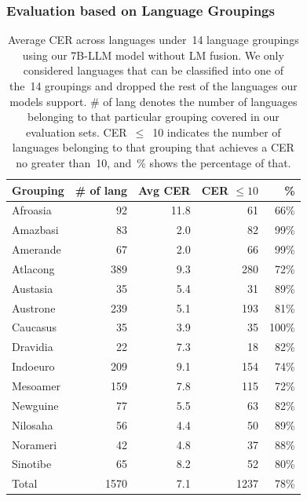 \documentclass[]{fairmeta}
\begin{document}
\subsubsection{Evaluation based on Language Groupings}
\begin{table}[htbp]
  \centering
  \begin{tabular}{lrrrr}
    \toprule
    Grouping & \# of lang & Avg CER & CER $\leq 10$ & \% \\
    \midrule
    Afroasia   &   92  &  11.8  &  61  &  66\%  \\
    Amazbasi   &   83  &   2.0  &  82  &  99\%  \\
    Amerande   &   67  &   2.0  &  66  &  99\%  \\
    Atlacong   &  389  &   9.3  & 280  &  72\%  \\
    Austasia   &   35  &   5.4  &  31  &  89\%  \\
    Austrone   &  239  &   5.1  & 193  &  81\%  \\
    Caucasus   &   35  &   3.9  &  35  & 100\%  \\
    Dravidia   &   22  &   7.3  &  18  &  82\%  \\
    Indoeuro   &  209  &   9.1  & 154  &  74\%  \\
    Mesoamer   &  159  &   7.8  & 115  &  72\%  \\
    Newguine   &   77  &   5.5  &  63  &  82\%  \\
    Nilosaha   &   56  &   4.4  &  50  &  89\%  \\
    Norameri   &   42  &   4.8  &  37  &  88\%  \\
    Sinotibe   &   65  &   8.2  &  52  &  80\%  \\
    \midrule
    Total      & 1570  &   7.1  & 1237 &  78\%  \\ 
    \bottomrule
  \end{tabular}
  \caption{Average CER across languages under~14 language groupings using our 7B-LLM model without LM fusion. We only considered languages that can be classified into one of the~14 groupings and dropped the rest of the languages our models support. \# of lang denotes the number of languages belonging to that particular grouping covered in our evaluation sets. CER~$\leq$~10 indicates the number of languages belonging to that grouping that achieves a CER no greater than~10, and~\% shows the percentage of that.}
  \label{tab:language_bucket}
\end{table}
\end{document}
